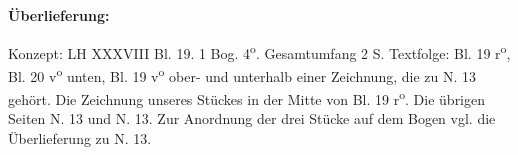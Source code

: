    
        
        \begin{ledgroupsized}[r]{120mm}
        \footnotesize 
        \pstart        
        \noindent\textbf{\"{U}berlieferung:}  
        \pend
        \end{ledgroupsized}
      
       
              \begin{ledgroupsized}[r]{114mm}
              \footnotesize 
              \pstart \parindent -6mm
              Konzept: LH XXXVIII Bl. 19. 1 Bog. 4\textsuperscript{o}. Gesamtumfang 2 S. Textfolge: Bl. 19 r\textsuperscript{o}, Bl. 20 v\textsuperscript{o} unten, Bl. 19 v\textsuperscript{o} ober- und unterhalb einer Zeichnung, die zu N. 13\protect{} geh\"{o}rt. Die Zeichnung unseres St\"{u}ckes in der Mitte von Bl. 19 r\textsuperscript{o}. Die \"{u}brigen Seiten N. 13\protect{} und N. 13\protect{}. Zur Anordnung der drei St\"{u}cke auf dem Bogen vgl. die \"{U}berlieferung zu N. 13\protect{}. \pend
              \end{ledgroupsized}
       
